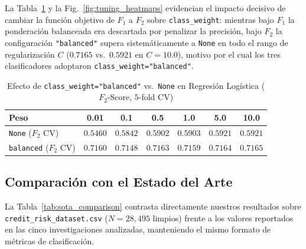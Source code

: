 \documentclass[conference]{IEEEtran}
\begin{document}
La Tabla~\ref{tab:opt_insight} y la Fig.~\ref{fig:tuning_heatmaps} evidencian el impacto decisivo de cambiar la función objetivo de $F_1$ a $F_2$ sobre \texttt{class\_weight}: mientras bajo $F_1$ la ponderación balanceada era descartada por penalizar la precisión, bajo $F_2$ la configuración \texttt{"balanced"} supera sistemáticamente a \texttt{None} en todo el rango de regularización $C$ ($0.7165$ vs.\ $0.5921$ en $C=10.0$), motivo por el cual los tres clasificadores adoptaron \texttt{class\_weight="balanced"}.

\begin{table}[t]
\centering
\scriptsize
\setlength{\tabcolsep}{3pt}
\caption{Efecto de \texttt{class\_weight="balanced"} vs.\ \texttt{None} en Regresión Logística ($F_2$-Score, $5$-fold CV)}
\label{tab:opt_insight}
\begin{tabular}{@{}lcccccc@{}}
\toprule
\textbf{Peso} & \textbf{0.01} & \textbf{0.1} & \textbf{0.5} & \textbf{1.0} & \textbf{5.0} & \textbf{10.0} \\
\midrule
\texttt{None} ($F_2$ CV) & $0.5460$ & $0.5842$ & $0.5902$ & $0.5903$ & $0.5921$ & $0.5921$ \\
\texttt{balanced} ($F_2$ CV) & $0.7160$ & $0.7148$ & $0.7163$ & $0.7159$ & $0.7164$ & $\mathbf{0.7165}$ \\
\bottomrule
\end{tabular}
\end{table}

\subsection{Comparación con el Estado del Arte}

La Tabla~\ref{tab:sota_comparison} contrasta directamente nuestros resultados sobre \texttt{credit\_risk\_dataset.csv} ($N=28{,}495$ limpios) frente a los valores reportados en las cinco investigaciones analizadas, manteniendo el mismo formato de métricas de clasificación.
\end{document}
